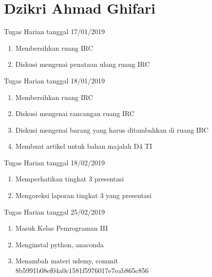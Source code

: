 \chapter{Dzikri Ahmad Ghifari}

Tugas Harian tanggal 17/01/2019
\begin{enumerate}
\item Membersihkan ruang IRC
\item Diskusi mengenai penataan ulang ruang IRC
\end{enumerate}

Tugas Harian tanggal 18/01/2019
\begin{enumerate}
\item Membersihkan ruang IRC
\item Diskusi mengenai rancangan ruang IRC
\item Diskusi mengenai barang yang harus ditambahkan di ruang IRC
\item Membuat artikel untuk bahan majalah D4 TI
\end{enumerate}

Tugas Harian tanggal 18/02/2019
\begin{enumerate}
\item Memperhatikan tingkat 3 presentasi
\item Mengoreksi laporan tingkat 3 yang presentasi
\end{enumerate}

Tugas Harian tanggal 25/02/2019
\begin{enumerate}
\item Masuk Kelas Pemrograman III
\item Menginstal python, anaconda
\item Menambah materi udemy, commit 8b5991b08ef04a0c1581f5976017e7eab865c856
\end{enumerate}




